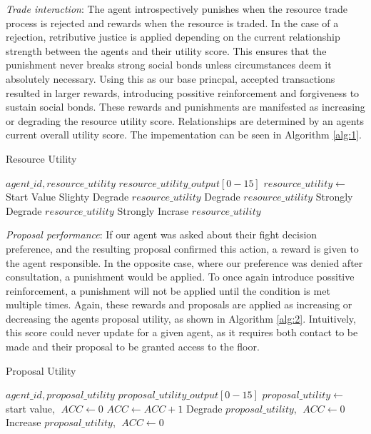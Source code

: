 \textit{Trade interaction}: The agent introspectively punishes when the resource trade process is rejected and rewards when the resource is traded. In the case of a rejection, retributive justice is applied depending on the current relationship strength between the agents and their utility score. This ensures that the punishment never breaks strong social bonds unless circumstances deem it absolutely necessary. Using this as our base princpal, accepted transactions resulted in larger rewards, introducing possitive reinforcement and forgiveness to sustain social bonds. These rewards and punishments are manifested as increasing or degrading the resource utility score. Relationships are determined by an agents current overall utility score. The impementation can be seen in Algorithm \ref{alg:1}. 

\begin{algorithm}[htb]
    \caption{Resource Utility}\label{alg:1}
    \begin{algorithmic} 
    \scriptsize
    \Require $agent\_id, resource\_utility$
    \Ensure $resource\_utility\_output[0-15]$
    \State $resource\_utility \leftarrow $ Start Value
    \EndIf
    \State Slighty Degrade $resource\_utility$ 
    \EndIf
    \State Degrade $resource\_utility$
    \Else
    \State Strongly Degrade $resource\_utility$
    \EndIf
    \EndIf
    \State Strongly Incrase $resource\_utility$ 
    \EndIf
    \end{algorithmic}
    \end{algorithm}



\textit{Proposal performance}: If our agent was asked about their fight decision preference, and the resulting proposal confirmed this action, a reward is given to the agent responsible. In the opposite case, where our preference was denied after consultation, a punishment would be applied. To once again introduce possitive reinforcement, a punishment will not be applied until the condition is met multiple times. Again, these rewards and proposals are applied as increasing or decreasing the agents proposal utility, as shown in Algorithm \ref{alg:2}. Intuitively, this score could never update for a given agent, as it requires both contact to be made and their proposal to be granted access to the floor. 

\begin{algorithm}
\caption{Proposal Utility}\label{alg:2}
\begin{algorithmic} 
\scriptsize
\Require $agent\_id, proposal\_utility$
\Ensure $proposal\_utility\_output[0-15]$
\State $proposal\_utility \leftarrow$ start value, $\; ACC \leftarrow 0$
\EndIf
{}
\State $ACC \leftarrow ACC+1$
\State Degrade $proposal\_utility$, $\; ACC \leftarrow 0$
\EndIf
\EndIf
{}
\State Increase $proposal\_utility$, $\; ACC \leftarrow 0$
\EndIf
\end{algorithmic}
\end{algorithm}


